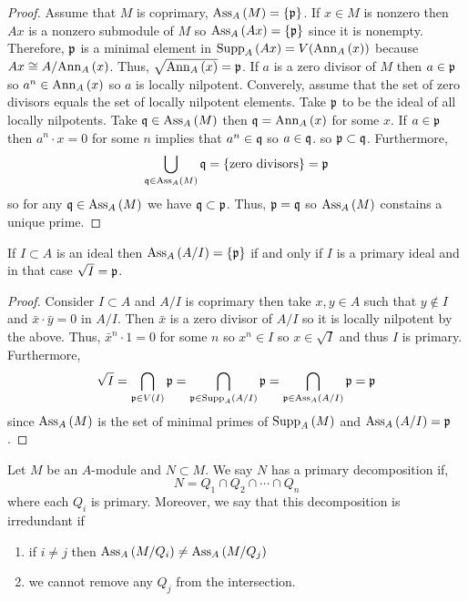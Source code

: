 \documentclass[12pt]{article}
\begin{document}
\begin{proof}
Assume that $M$ is coprimary, $\mathrm{Ass}_{A}\left( M \right) = \{ \mathfrak{p} \}$. If $x \in M$ is nonzero then $Ax$ is a nonzero submodule of $M$ so $\mathrm{Ass}_{A}\left( Ax \right) = \{ \mathfrak{p} \}$ since it is nonempty. Therefore, $\mathfrak{p}$ is a minimal element in $\mathrm{Supp}_{A}\left(A x \right) = V(\mathrm{Ann}_{A}\left(x\right))$
because $Ax \cong A / \mathrm{Ann}_{A}\left(x\right)$. Thus, $\sqrt{\mathrm{Ann}_{A}\left(x\right)} = \mathfrak{p}$. If $a$ is a zero divisor of $M$ then $a \in \mathfrak{p}$ so $a^n \in \mathrm{Ann}_{A}\left(x\right)$ so $a$ is locally nilpotent. Converely, assume that the set of zero divisors equals the set of locally nilpotent elements. Take $\mathfrak{p}$ to be the ideal of all locally nilpotents. Take $\mathfrak{q} \in \mathrm{Ass}_{A}\left( M \right)$ then $\mathfrak{q} = \mathrm{Ann}_{A}\left(x\right)$ for some $x$. If $a \in \mathfrak{p}$ then $a^n \cdot x = 0$ for some $n$ implies that $a^n \in \mathfrak{q}$ so $a \in \mathfrak{q}$. so $\mathfrak{p} \subset \mathfrak{q}$. Furthermore,
\[ \bigcup_{\mathfrak{q} \in \mathrm{Ass}_{A}\left( M \right)} \mathfrak{q} = \{ \text{zero divisors} \} = \mathfrak{p} \]
so for any $\mathfrak{q} \in \mathrm{Ass}_{A}\left( M \right)$ we have $\mathfrak{q} \subset \mathfrak{p}$. Thus, $\mathfrak{p} = \mathfrak{q}$ so $\mathrm{Ass}_{A}\left( M \right)$ constains a unique prime.
\end{proof}

\begin{corollary}
If $I \subset A$ is an ideal then $\mathrm{Ass}_{A}\left( A / I \right) = \{ \mathfrak{p} \}$ if and only if $I$ is a primary ideal and in that case $\sqrt{I} = \mathfrak{p}$. 
\end{corollary}

\begin{proof}
Consider $I \subset A$ and $A / I$ is coprimary then take $x,y \in A$ such that $y \notin I$ and $\bar{x} \cdot \bar{y} = 0$ in $A / I$. Then $\bar{x}$ is a zero divisor of $A / I$ so it is locally nilpotent by the above. Thus, $\bar{x}^n \cdot 1 = 0$ for some $n$ so $x^n \in I$ so $x \in \sqrt{I}$ and thus $I$ is primary. Furthermore,
\[ \sqrt{I} = \bigcap_{\mathfrak{p} \in V(I)} \mathfrak{p} = \bigcap_{\mathfrak{p} \in \mathrm{Supp}_{A}\left(A / I \right)} \mathfrak{p} = \bigcap_{\mathfrak{p} \in \mathrm{Ass}_{A}\left( A / I \right)} \mathfrak{p} = \mathfrak{p} \]
since $\mathrm{Ass}_{A}\left( M \right)$ is the set of minimal primes of $\mathrm{Supp}_{A}\left(M \right)$ and $\mathrm{Ass}_{A}\left( A / I \right) = \mathfrak{p}$.  
\end{proof}

\begin{definition}
Let $M$ be an $A$-module and $N \subset M$. We say $N$ has a primary decomposition if,
\[ N = Q_1 \cap Q_2 \cap \cdots \cap Q_n \]
where each $Q_i$ is primary. Moreover, we say that this decomposition is irredundant if 
\begin{enumerate}
\item if $i \neq j$ then $\mathrm{Ass}_{A}\left( M / Q_i \right) \neq \mathrm{Ass}_{A}\left( M / Q_j \right)$ 

\item we cannot remove any $Q_j$ from the intersection.
\end{enumerate}
\end{definition}
\end{document}
